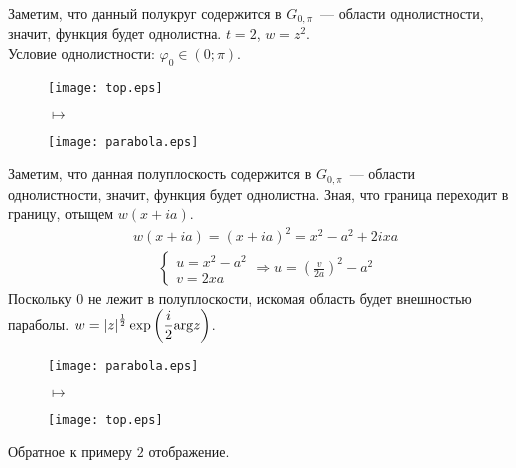Заметим, что данный полукруг содержится в $G_{0, \pi}$~--- области
однолистности, значит, функция будет однолистна.
\Example
$t = 2$, $w = z^2$.
\\
Условие однолистности: $\varphi_0 \in (0; \pi)$.
\\
\begin{figure}[h!]
    \begin{minipage}[c]{0.45\textwidth}
        \centering
        \texttt{[image: top.eps]}
    \end{minipage}
    \begin{minipage}[c]{0.1\textwidth}
        \centering
        \LARGE{$\mapsto$}
    \end{minipage}
    \begin{minipage}[c]{0.45\textwidth}
        \centering
        \texttt{[image: parabola.eps]}
    \end{minipage}
    \label{fig:24.2}
\end{figure}
Заметим, что данная полуплоскость содержится в $G_{0, \pi}$~--- области
однолистности, значит, функция будет однолистна. Зная, что граница переходит в
границу, отыщем $w(x+ia)$.
\begin{align*}
  & w(x+ia) = (x+ia)^2 = x^2 - a^2 + 2ixa
\end{align*}
\begin{align*}
  & \begin{cases}
      u = x^2 - a^2 \\
      v = 2xa
  \end{cases} \Rightarrow u  = \left( \frac{v}{2a} \right)^2 - a^2
\end{align*}
Поскольку $0$ не лежит в полуплоскости, искомая область будет внешностью
параболы.
\Example
$w = \left| z \right|^{\frac{1}{2}}\exp \left(\displaystyle \frac{i}{2}\mathrm{arg} z\right)$.
\begin{figure}[h!]
    \begin{minipage}[c]{0.45\textwidth}
        \centering
        \texttt{[image: parabola.eps]}
    \end{minipage}
    \begin{minipage}[c]{0.1\textwidth}
        \centering
        \LARGE{$\mapsto$}
    \end{minipage}
    \begin{minipage}[c]{0.45\textwidth}
        \centering
        \texttt{[image: top.eps]}
    \end{minipage}
    \label{fig:24.3}
\end{figure}
Обратное к примеру $2$ отображение.
